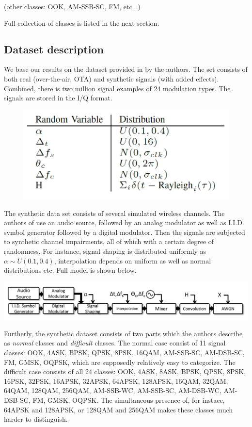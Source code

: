 \documentclass[12pt]{article}
\theoremstyle{plain}
\theoremstyle{definition}
\theoremstyle{remark}
\begin{document}
(other classes: OOK, AM-SSB-SC, FM, etc...)

	Full collection of classes is listed in the next section.
	

	
	\subsection{Dataset description}
	
	We base our results on the dataset provided in \cite{ORC} by the authors. The set consists of both real (over-the-air, OTA) and synthetic signals (with added effects). Combined, there is two million signal examples of 24 modulation types. The signals are stored in the I/Q format.
	
	\begin{figure}
	\includegraphics[scale=0.25]{random_variables.png}
	\end{figure}
	The synthetic data set consists of several simulated wireless channels. The authors of \cite{ORC} use an audio source, followed by an analog modulator as well as I.I.D. symbol generator followed by a digital modulator. Then the signals are subjected to synthetic channel impairments, all of which with a certain degree of randomness.
	For instance, signal shaping is distributed uniformly as $\alpha \sim U(0.1, 0.4)$, interpolation depends on uniform as well as normal distributions etc. Full model is shown below.
	
	\includegraphics[scale=0.25]{signal_generation.png}
	
	Furtherly, the synthetic dataset consists of two parts which the authors describe as \textit{normal} classes and \textit{difficult} classes. The normal case consist of 11 signal classes: OOK, 4ASK, BPSK, QPSK, 8PSK, 16QAM, AM-SSB-SC, AM-DSB-SC, FM, GMSK, OQPSK, which are supposedly relatively easy to categorize. The difficult case consists of all 24 classes: OOK, 4ASK, 8ASK, BPSK, QPSK, 8PSK, 16PSK, 32PSK, 16APSK, 32APSK, 64APSK, 128APSK, 16QAM, 32QAM, 64QAM, 128QAM, 256QAM, AM-SSB-WC, AM-SSB-SC, AM-DSB-WC, AM-DSB-SC, FM, GMSK, OQPSK. The simultaneous presence of, for instace,  64APSK and 128APSK, or 128QAM and 256QAM makes these classes much harder to distinguish.
	
\end{document}
